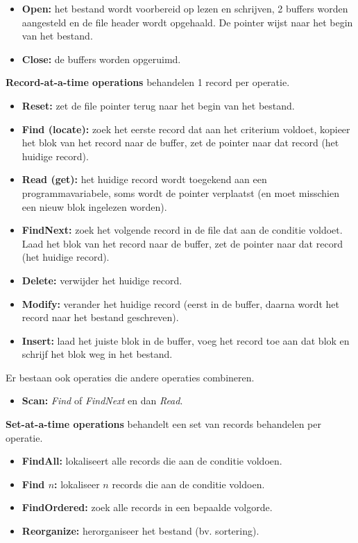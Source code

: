 \begin{itemize}
	\item \textbf{Open:} het bestand wordt voorbereid op lezen en schrijven, 2 buffers worden aangesteld en de file header wordt opgehaald. De pointer wijst naar het begin van het bestand.
	\item \textbf{Close:} de buffers worden opgeruimd.
\end{itemize}
\textbf{Record-at-a-time operations} behandelen 1 record per operatie.
\begin{itemize}
	\item \textbf{Reset:} zet de file pointer terug naar het begin van het bestand.
	\item \textbf{Find (locate):} zoek het eerste record dat aan het criterium voldoet, kopieer het blok van het record naar de buffer, zet de pointer naar dat record (het huidige record).
	\item \textbf{Read (get):} het huidige record wordt toegekend aan een programmavariabele, soms wordt de pointer verplaatst (en moet misschien een nieuw blok ingelezen worden).
	\item \textbf{FindNext:} zoek het volgende record in de file dat aan de conditie voldoet. Laad het blok van het record naar de buffer, zet de pointer naar dat record (het huidige record).
	\item \textbf{Delete:} verwijder het huidige record.
	\item \textbf{Modify:} verander het huidige record (eerst in de buffer, daarna wordt het record naar het bestand geschreven).
	\item \textbf{Insert:} laad het juiste blok in de buffer, voeg het record toe aan dat blok en schrijf het blok weg in het bestand.
\end{itemize}
Er bestaan ook operaties die andere operaties combineren.
\begin{itemize}
	\item \textbf{Scan:} \textit{Find} of \textit{FindNext} en dan \textit{Read}.
\end{itemize}
\textbf{Set-at-a-time operations} behandelt een set van records behandelen per operatie.
\begin{itemize}
	\item \textbf{FindAll:} lokaliseert alle records die aan de conditie voldoen.
	\item \textbf{Find $n$:} lokaliseer $n$ records die aan de conditie voldoen.
	\item \textbf{FindOrdered:} zoek alle records in een bepaalde volgorde.
	\item \textbf{Reorganize:} herorganiseer het bestand (bv. sortering).
\end{itemize}


